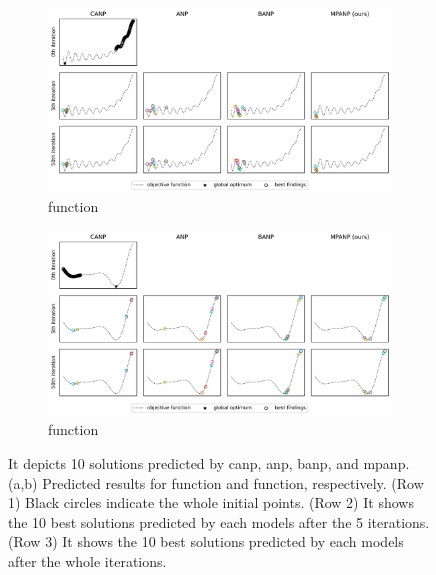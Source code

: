 \begin{figure}
\centering
\begin{subfigure}[b]{\textwidth}
\includegraphics[width=\linewidth]{figure/app_visualize_bo_gram_anp.pdf}
\caption{\citet{gramacy2012cases} function}
\end{subfigure}
\bigskip

\begin{subfigure}[b]{\textwidth}
\includegraphics[width=\linewidth]{figure/app_visualize_bo_sob_anp.pdf}
\caption{\citet{sobester2008engineering} function}
\end{subfigure}
\caption{It depicts 10 solutions predicted by \gls{canp}, \gls{anp}, \gls{banp}, and \gls{mpanp}. (a,b) Predicted results for \citet{gramacy2012cases} function and \citet{sobester2008engineering} function, respectively. (Row 1) Black circles indicate the whole initial points. (Row 2) It shows the 10 best solutions predicted by each models after the 5 iterations. (Row 3) It shows the 10 best solutions predicted by each models after the whole iterations.}
\label{figure/app_visualize_bo_anp}
\end{figure}




